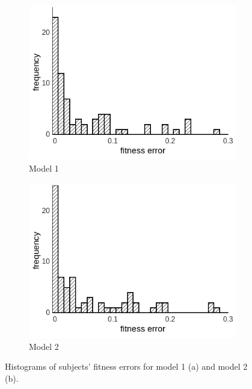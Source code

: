 \documentclass[a4paper]{scrreprt}
\begin{document}
\begin{figure}
\centering
    \begin{subfigure}[b]{0.49\textwidth}
        \includegraphics[width=\textwidth]{figs/sec3/fitting/fitness_mod1.jpeg}
        \caption{Model 1}
    \end{subfigure}
\begin{subfigure}[b]{0.49\textwidth}
        \includegraphics[width=\textwidth]{figs/sec3/fitting/fitness_mod2.jpeg}
        \caption{Model 2}
    \end{subfigure}
\caption{Histograms of subjects' fitness errors for model 1 (a) and model 2 (b).}
\label{fig:fitness}
\end{figure}
\end{document}
